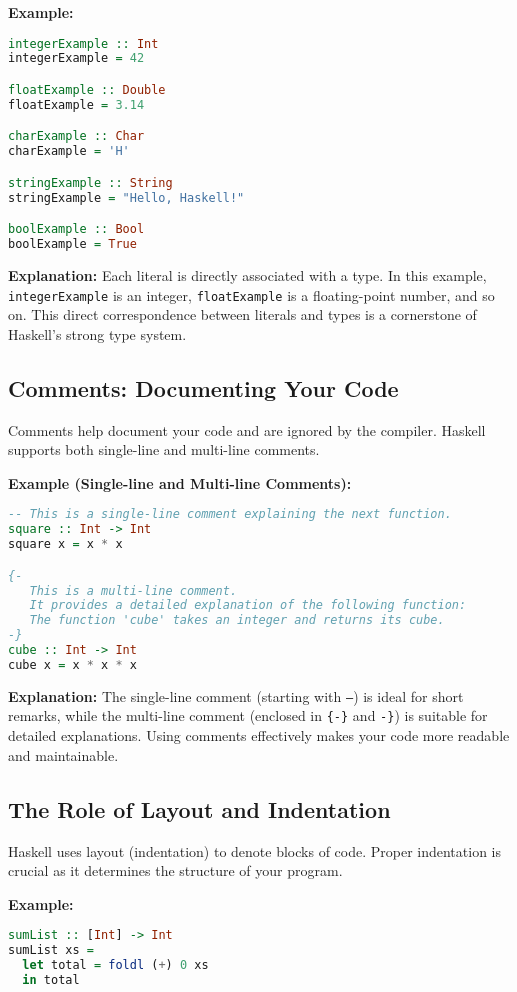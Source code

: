 \documentclass[11pt,a4paper]{article}
\begin{document}
\textbf{Example:}
\begin{lstlisting}[language=Haskell]
integerExample :: Int
integerExample = 42

floatExample :: Double
floatExample = 3.14

charExample :: Char
charExample = 'H'

stringExample :: String
stringExample = "Hello, Haskell!"

boolExample :: Bool
boolExample = True
\end{lstlisting}

\textbf{Explanation:}  
Each literal is directly associated with a type. In this example, \texttt{integerExample} is an integer, \texttt{floatExample} is a floating-point number, and so on. This direct correspondence between literals and types is a cornerstone of Haskell's strong type system.

\subsection{Comments: Documenting Your Code}
Comments help document your code and are ignored by the compiler. Haskell supports both single-line and multi-line comments.

\textbf{Example (Single-line and Multi-line Comments):}
\begin{lstlisting}[language=Haskell]
-- This is a single-line comment explaining the next function.
square :: Int -> Int
square x = x * x

{- 
   This is a multi-line comment.
   It provides a detailed explanation of the following function:
   The function 'cube' takes an integer and returns its cube.
-}
cube :: Int -> Int
cube x = x * x * x
\end{lstlisting}

\textbf{Explanation:}  
The single-line comment (starting with \texttt{--}) is ideal for short remarks, while the multi-line comment
(enclosed in \texttt{\{-\}} and \texttt{-\}}) is suitable for detailed explanations. Using comments effectively
  makes your code more readable and maintainable. 

\subsection{The Role of Layout and Indentation}
Haskell uses layout (indentation) to denote blocks of code. Proper indentation is crucial as it determines the structure of your program.

\textbf{Example:}
\begin{lstlisting}[language=Haskell]
sumList :: [Int] -> Int
sumList xs =
  let total = foldl (+) 0 xs
  in total
\end{lstlisting}
\end{document}
